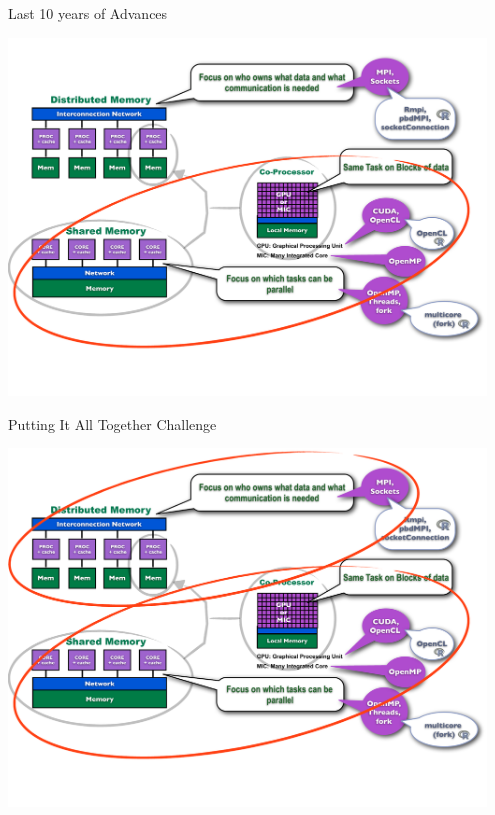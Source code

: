 \begin{frame}
\begin{block}{Last 10 years of Advances}
    
\includegraphics[width=0.95\textwidth]
{../common/pics/hardware/ParallelHardware9.pdf}
\end{block}
\end{frame}

\begin{frame}
\begin{block}{Putting It All Together Challenge}
    
\includegraphics[width=0.95\textwidth]
{../common/pics/hardware/ParallelHardware10.pdf}
\end{block}
\end{frame}

